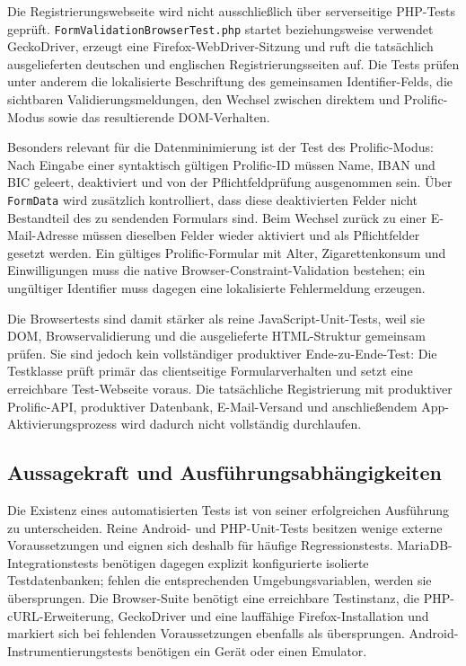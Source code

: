 \begin{neu}
Die Registrierungswebseite wird nicht ausschließlich über serverseitige PHP-Tests geprüft. \texttt{FormValidationBrowserTest.php} startet beziehungsweise verwendet GeckoDriver, erzeugt eine Firefox-WebDriver-Sitzung und ruft die tatsächlich ausgelieferten deutschen und englischen Registrierungsseiten auf. Die Tests prüfen unter anderem die lokalisierte Beschriftung des gemeinsamen Identifier-Felds, die sichtbaren Validierungsmeldungen, den Wechsel zwischen direktem und Prolific-Modus sowie das resultierende DOM-Verhalten.

Besonders relevant für die Datenminimierung ist der Test des Prolific-Modus: Nach Eingabe einer syntaktisch gültigen Prolific-ID müssen Name, IBAN und BIC geleert, deaktiviert und von der Pflichtfeldprüfung ausgenommen sein. Über \texttt{FormData} wird zusätzlich kontrolliert, dass diese deaktivierten Felder nicht Bestandteil des zu sendenden Formulars sind. Beim Wechsel zurück zu einer E-Mail-Adresse müssen dieselben Felder wieder aktiviert und als Pflichtfelder gesetzt werden. Ein gültiges Prolific-Formular mit Alter, Zigarettenkonsum und Einwilligungen muss die native Browser-Constraint-Validation bestehen; ein ungültiger Identifier muss dagegen eine lokalisierte Fehlermeldung erzeugen.

Die Browsertests sind damit stärker als reine JavaScript-Unit-Tests, weil sie DOM, Browservalidierung und die ausgelieferte HTML-Struktur gemeinsam prüfen. Sie sind jedoch kein vollständiger produktiver Ende-zu-Ende-Test: Die Testklasse prüft primär das clientseitige Formularverhalten und setzt eine erreichbare Test-Webseite voraus. Die tatsächliche Registrierung mit produktiver Prolific-API, produktiver Datenbank, E-Mail-Versand und anschließendem App-Aktivierungsprozess wird dadurch nicht vollständig durchlaufen.

\subsection{Aussagekraft und Ausführungsabhängigkeiten}

Die Existenz eines automatisierten Tests ist von seiner erfolgreichen Ausführung zu unterscheiden. Reine Android- und PHP-Unit-Tests besitzen wenige externe Voraussetzungen und eignen sich deshalb für häufige Regressionstests. MariaDB-Integrationstests benötigen dagegen explizit konfigurierte isolierte Testdatenbanken; fehlen die entsprechenden Umgebungsvariablen, werden sie übersprungen. Die Browser-Suite benötigt eine erreichbare Testinstanz, die PHP-cURL-Erweiterung, GeckoDriver und eine lauffähige Firefox-Installation und markiert sich bei fehlenden Voraussetzungen ebenfalls als übersprungen. Android-Instrumentierungstests benötigen ein Gerät oder einen Emulator.


\end{neu}
